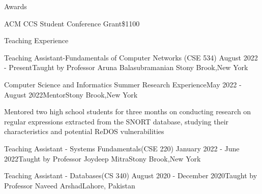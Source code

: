 \documentclass{resume} %
\begin{document}
\begin{rSection}{Awards}
\begin{rSubsection}
{ACM CCS Student Conference Grant}{\$1100}{}{}
\end{rSubsection}
\end{rSection}
\begin{rSection}{Teaching Experience}
\begin{rSubsection}
{Teaching Assistant-Fundamentals of Computer Networks (CSE 534) }{August 2022 - Present}{Taught by Professor Aruna Balasubramanian }{Stony Brook,New York}
\end{rSubsection}
\begin{rSubsection}{Computer Science and Informatics Summer Research Experience}{May 2022 - August 2022}{Mentor}{Stony Brook,New York}
\item Mentored two high school students for three months on conducting research on regular expressions extracted from the SNORT database, studying their  characteristics and potential ReDOS vulnerabilities
\end{rSubsection}
\begin{rSubsection}
{Teaching Assistant - Systems Fundamentals(CSE 220) }{January 2022 - June 2022}{Taught by Professor Joydeep Mitra}{Stony Brook,New York}
\end{rSubsection}
\begin{rSubsection}
{Teaching Assistant - Databases(CS 340)}{ August 2020 - December 2020}{Taught by Professor Naveed Arshad}{Lahore, Pakistan}
\end{rSubsection}
\end{rSection}

\end{document}
